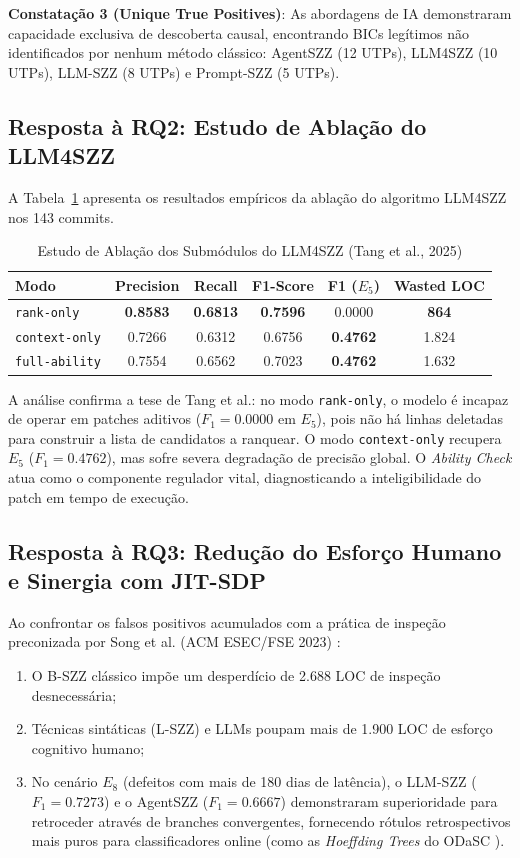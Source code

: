 \documentclass[10pt,journal,compsoc]{IEEEtran}
\begin{document}
\textbf{Constatação 3 (Unique True Positives)}: As abordagens de IA demonstraram capacidade exclusiva de descoberta causal, encontrando BICs legítimos não identificados por nenhum método clássico: AgentSZZ (12 UTPs), LLM4SZZ (10 UTPs), LLM-SZZ (8 UTPs) e Prompt-SZZ (5 UTPs).

\subsection{Resposta à RQ2: Estudo de Ablação do LLM4SZZ}
A Tabela~\ref{tab:ablation} apresenta os resultados empíricos da ablação do algoritmo LLM4SZZ nos 143 commits.

\begin{table}[h]
\centering
\caption{Estudo de Ablação dos Submódulos do LLM4SZZ (Tang et al., 2025)}
\label{tab:ablation}
\begin{tabular}{lccccc}
\toprule
\textbf{Modo} & \textbf{Precision} & \textbf{Recall} & \textbf{F1-Score} & \textbf{F1 ($E_5$)} & \textbf{Wasted LOC} \\
\midrule
\texttt{rank-only} & \textbf{0.8583} & \textbf{0.6813} & \textbf{0.7596} & 0.0000 & \textbf{864} \\
\texttt{context-only} & 0.7266 & 0.6312 & 0.6756 & \textbf{0.4762} & 1.824 \\
\texttt{full-ability} & 0.7554 & 0.6562 & 0.7023 & \textbf{0.4762} & 1.632 \\
\bottomrule
\end{tabular}
\end{table}

A análise confirma a tese de Tang et al.: no modo \texttt{rank-only}, o modelo é incapaz de operar em patches aditivos ($F_1 = 0.0000$ em $E_5$), pois não há linhas deletadas para construir a lista de candidatos a ranquear. O modo \texttt{context-only} recupera $E_5$ ($F_1 = 0.4762$), mas sofre severa degradação de precisão global. O \textit{Ability Check} atua como o componente regulador vital, diagnosticando a inteligibilidade do patch em tempo de execução.

\subsection{Resposta à RQ3: Redução do Esforço Humano e Sinergia com JIT-SDP}
Ao confrontar os falsos positivos acumulados com a prática de inspeção preconizada por Song et al. (ACM ESEC/FSE 2023) \cite{song2023practical}:
\begin{enumerate}
    \item O B-SZZ clássico impõe um desperdício de 2.688 LOC de inspeção desnecessária;
    \item Técnicas sintáticas (L-SZZ) e LLMs poupam mais de 1.900 LOC de esforço cognitivo humano;
    \item No cenário $E_8$ (defeitos com mais de 180 dias de latência), o LLM-SZZ ($F_1 = 0.7273$) e o AgentSZZ ($F_1 = 0.6667$) demonstraram superioridade para retroceder através de branches convergentes, fornecendo rótulos retrospectivos mais puros para classificadores online (como as \textit{Hoeffding Trees} do ODaSC \cite{song2023practical}).
\end{enumerate}
\end{document}
